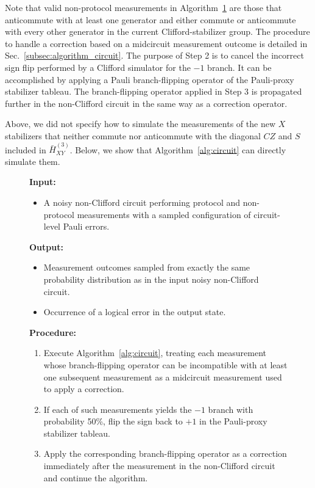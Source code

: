\documentclass[
 reprint,
 amsmath,amssymb,
 pra,superscriptaddress, nofootinbib
]{revtex4-2}
\theoremstyle{definition}
\theoremstyle{plain}
\begin{document}
Note that valid non-protocol measurements in Algorithm~\ref{alg:branch} are those that anticommute with at least one generator and either commute or anticommute with every other generator in the current Clifford-stabilizer group.
The procedure to handle a correction based on a midcircuit measurement outcome is detailed in Sec.~\ref{subsec:algorithm_circuit}.
The purpose of Step 2 is to cancel the incorrect sign flip performed by a Clifford simulator for the $-1$ branch. 
It can be accomplished by applying a Pauli branch-flipping operator of the Pauli-proxy stabilizer tableau. 
The branch-flipping operator applied in Step 3 is propagated further in the non-Clifford circuit in the same way as a correction operator.

Above, we did not specify how to simulate the measurements of the new $X$ stabilizers that neither commute nor anticommute with the diagonal $CZ$ and $S$ included in $\bar{H}^{(3)}_{XY}$.
Below, we show that Algorithm~\ref{alg:circuit} can directly simulate them.
%
\begin{figure}[tb]
\normalsize
\begin{algorithm}\label{alg:branch}

\leavevmode\par
\medskip
\noindent\textbf{Input:}\par
\noindent

\begin{itemize}
    \item A noisy non-Clifford circuit performing protocol and non-protocol measurements with a sampled configuration of circuit-level Pauli errors.
\end{itemize}

\noindent\textbf{Output:}\par
\noindent
\begin{itemize}
    \item Measurement outcomes sampled from exactly the same probability distribution as in the input noisy non-Clifford circuit.
    \item Occurrence of a logical error in the output state.
\end{itemize}

\noindent\textbf{Procedure:}\par
\begin{enumerate}[label=\textbf{\arabic*.}]
  \item Execute Algorithm~\ref{alg:circuit}, treating each measurement whose branch-flipping operator can be incompatible with at least one subsequent measurement as a midcircuit measurement used to apply a correction.
  \item If each of such measurements yields the $-1$ branch with probability 50\%, flip the sign back to $+1$ in the Pauli-proxy stabilizer tableau. 
  \item Apply the corresponding branch-flipping operator as a correction immediately after the measurement in the non-Clifford circuit and continue the algorithm.
\end{enumerate}
\end{algorithm}
\end{figure}
\end{document}

